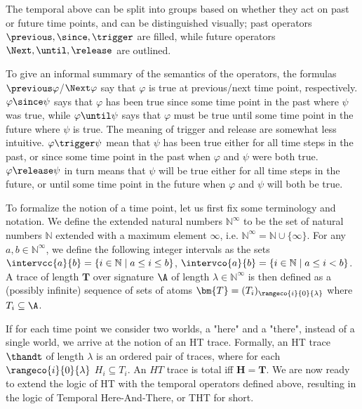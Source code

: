 The temporal above can be split into groups based on whether they act
on past or future time points, and can be distinguished visually; past
operators $\previous, \since, \trigger$ are filled, while future
operators $\Next, \until, \release$ are outlined.

To give an informal summary of the semantics of the operators, the
formulas $\previous \varphi$/$\Next \varphi$ say that $\varphi$ is
true at previous/next time point, respectively.  $\varphi \since \psi$
says that $\varphi$ has been true since some time point in the past
where $\psi$ was true, while $\varphi \until \psi$ says that $\varphi$
must be true until some time point in the future where $\psi$ is true.
The meaning of trigger and release are somewhat less
intuitive. $\varphi \trigger \psi$ mean that $\psi$ has been true
either for all time steps in the past, or since some time point in the
past when $\varphi$ and $\psi$ were both true. $\varphi \release \psi$
in turn means that $\psi$ will be true either for all time steps in
the future, or until some time point in the future when $\varphi$ and
$\psi$ will both be true.

To formalize the notion of a time point, let us first fix some
terminology and notation. We define the extended natural numbers
$\mathbb{N}^\infty$ to be the set of natural numbers $\mathbb{N}$
extended with a maximum element $\infty$, i.e.
$\mathbb{N}^\infty = \mathbb{N} \cup \{ \infty \}$. For any
$a,b \in \mathbb{N}^\infty$, we define the following integer intervals
as the sets $\intervcc{a}{b}=\{ i \in \mathbb{N} \mid a \leq i \leq b \}$,
$\intervco{a}{b}=\{ i \in \mathbb{N} \mid a \leq i < b \}$. A trace of length
$\bm{T}$ over signature $\A$ of length
$\lambda \in \mathbb{N}^\infty$ is then defined as a (possibly
infinite) sequence of sets of atoms $\bm{T} = (T_i)_{\rangeco{i}{0}{\lambda}}$
where $T_i \subseteq \A$.

If for each time point we consider two worlds, a "here" and a "there",
instead of a single world, we arrive at the notion of an HT
trace. Formally, an HT trace $\thandt$ of length $\lambda$ is an
ordered pair of traces, where for each $\rangeco{i}{0}{\lambda}$
$H_i \subseteq T_i$. An $HT$ trace is total iff $\bm{H} = \bm{T}$. We
are now ready to extend the logic of HT with the temporal operators
defined above, resulting in the logic of Temporal Here-And-There, or
THT for short.

